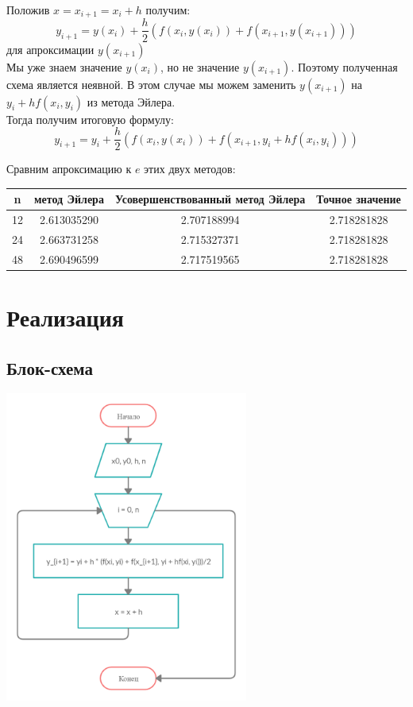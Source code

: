 \documentclass[11pt, english]{article}
\begin{document}
    Положив $x = x_{i+1} = x_i + h$ получим:
    $$y_{i+1} = y(x_i) + \frac{h}{2}(f(x_i, y(x_i)) + f(x_{i+1}, y(x_{i+1})))$$
    для апроксимации $y(x_{i+1})$ \\

    Мы уже знаем значение $y(x_i)$, но не значение $y(x_{i+1})$.
    Поэтому полученная схема является неявной.
    В этом случае мы можем заменить $y(x_{i+1})$ на $y_i + hf(x_i, y_i)$ из метода Эйлера. \\

    Тогда получим итоговую формулу:
    \[y_{i+1} = y_i + \frac{h}{2}(f(x_i, y(x_i)) + f(x_{i+1}, y_i + hf(x_i, y_i)))\]

    Сравним апроксимацию к $e$ этих двух методов:
    \begin{center}
        \begin{tabular}{||c | c | c | c||}
            \hline
            n & метод Эйлера & Усовершенствованный метод Эйлера & Точное значение \\ [0.5ex]
            \hline\hline
            12 & 2.613035290 & 2.707188994 & 2.718281828 \\
            \hline
            24 & 2.663731258 & 2.715327371 & 2.718281828 \\
            \hline
            48 & 2.690496599 & 2.717519565 & 2.718281828 \\
            \hline
        \end{tabular}
    \end{center}
    \newpage


    \section{Реализация}

    \subsection{Блок-схема}
    \begin{center}
        \includegraphics[width=8cm]{schema.png}
    \end{center}
\end{document}

